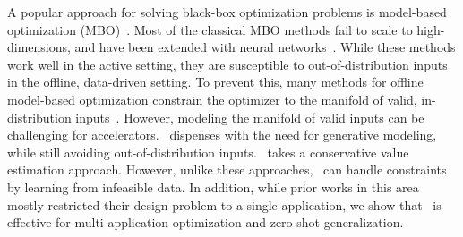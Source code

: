 A popular approach for solving black-box optimization problems is model-based optimization (MBO)~\citep{snoek15scalable,shahriari2016TakingTH,snoek2012practical}. Most of the classical MBO methods fail to scale to high-dimensions, and have been extended with neural networks~\citep{snoek15scalable,snoek2012practical,kim2018attentive,garnelo18neural,garnelo18conditional,p3bo:arxiv:2020,angermueller2019model,mirhoseini2020chip}. While these methods work well in the active setting, they are susceptible to out-of-distribution inputs~\citep{trabucco2021designbench} in the offline, data-driven setting. To prevent this, many methods for offline model-based optimization constrain the optimizer to the manifold of valid, in-distribution inputs~\citep{brookes19a,fannjiang2020autofocused,kumar2019model}. However, modeling the manifold of valid inputs can be challenging for accelerators. \primemethodname\ dispenses with the need for generative modeling, while still avoiding out-of-distribution inputs. \primemethodname\ takes a conservative value estimation approach. However, unlike these approaches, \primemethodname\ can handle constraints by learning from infeasible data. In addition, while prior works in this area mostly restricted their design problem to a single application, we show that \primemethodname\ is effective for multi-application optimization and zero-shot generalization.